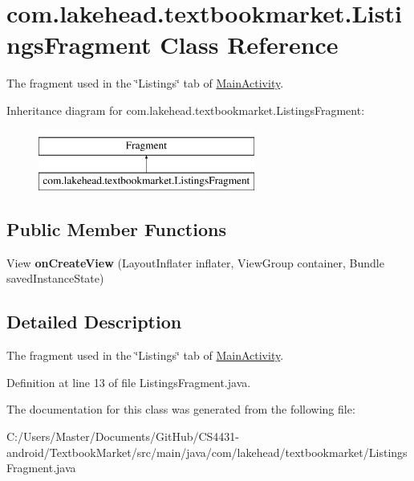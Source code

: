 \hypertarget{classcom_1_1lakehead_1_1textbookmarket_1_1_listings_fragment}{\section{com.\-lakehead.\-textbookmarket.\-Listings\-Fragment Class Reference}
\label{classcom_1_1lakehead_1_1textbookmarket_1_1_listings_fragment}
}


The fragment used in the \char`\"{}\-Listings\char`\"{} tab of \hyperlink{classcom_1_1lakehead_1_1textbookmarket_1_1_main_activity}{Main\-Activity}.  


Inheritance diagram for com.\-lakehead.\-textbookmarket.\-Listings\-Fragment\-:\begin{figure}[H]
\begin{center}
\leavevmode
\includegraphics[height=2.000000cm]{classcom_1_1lakehead_1_1textbookmarket_1_1_listings_fragment}
\end{center}
\end{figure}
\subsection*{Public Member Functions}
\begin{DoxyCompactItemize}
\item 
\hypertarget{classcom_1_1lakehead_1_1textbookmarket_1_1_listings_fragment_a80db4b3767f3cfa27750e0eea476dead}{View {\bfseries on\-Create\-View} (Layout\-Inflater inflater, View\-Group container, Bundle saved\-Instance\-State)}\label{classcom_1_1lakehead_1_1textbookmarket_1_1_listings_fragment_a80db4b3767f3cfa27750e0eea476dead}

\end{DoxyCompactItemize}


\subsection{Detailed Description}
The fragment used in the \char`\"{}\-Listings\char`\"{} tab of \hyperlink{classcom_1_1lakehead_1_1textbookmarket_1_1_main_activity}{Main\-Activity}. 

Definition at line 13 of file Listings\-Fragment.\-java.



The documentation for this class was generated from the following file\-:\begin{DoxyCompactItemize}
\item 
C\-:/\-Users/\-Master/\-Documents/\-Git\-Hub/\-C\-S4431-\/android/\-Textbook\-Market/src/main/java/com/lakehead/textbookmarket/Listings\-Fragment.\-java\end{DoxyCompactItemize}

